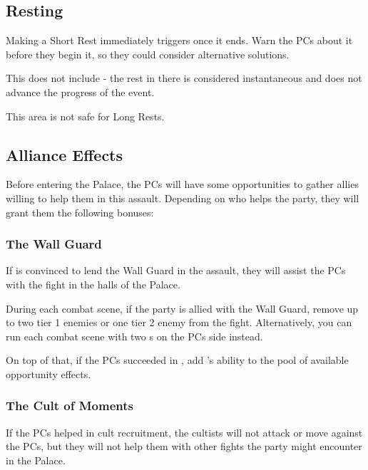 \subsection{Resting}

Making a Short Rest immediately triggers  once it ends. Warn the PCs about it before they begin it, so they could consider alternative solutions.

This does not include  - the rest in there is considered instantaneous and does not advance the progress of the event.

This area is not safe for Long Rests.




\subsection{Alliance Effects}
\label{ssec:kholinarPalaceAllianceEffects}

Before entering the Palace, the PCs will have some opportunities to gather allies willing to help them in this assault. Depending on who helps the party, they will grant them the following bonuses:

\subsubsection{The Wall Guard}

If \npcHighmarshal{} is convinced to lend the Wall Guard in the assault, they will assist the PCs with the fight in the halls of the Palace. 

During each combat scene, if the party is allied with the Wall Guard, remove up to two tier 1 enemies or one tier 2 enemy from the fight. Alternatively, you can run each combat scene with two \enemyWallGuard{}s on the PCs side instead.

On top of that, if the PCs succeeded in , add \npcHighmarshal{}'s ability to the pool of available opportunity effects.

\subsubsection{The Cult of Moments}

If the PCs helped in cult recruitment, the cultists will not attack or move against the PCs, but they will not help them with other fights the party might encounter in the Palace.

